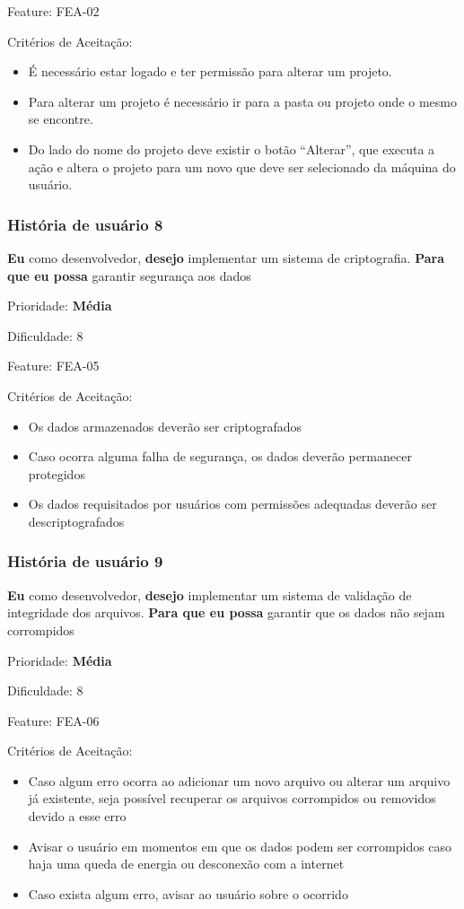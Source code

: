     Feature: FEA-02

    Critérios de Aceitação:
    \begin{itemize}
      \item É necessário estar logado e ter permissão para alterar um projeto. 
      \item Para alterar um projeto é necessário ir para a pasta ou projeto onde o mesmo se encontre.
      \item Do lado do nome do projeto deve existir o botão “Alterar”, que executa a ação e altera o projeto para um novo que deve ser selecionado da máquina do usuário.
    \end{itemize}

  \subsubsection{História de usuário 8}
    \textbf{Eu} como desenvolvedor, \textbf{desejo} implementar um sistema de criptografia. \textbf{Para que eu possa} garantir segurança aos dados

    Prioridade: \textbf{Média}

    Dificuldade: 8

    Feature: FEA-05

    Critérios de Aceitação:
    \begin{itemize}
      \item Os dados armazenados deverão ser criptografados
      \item Caso ocorra alguma falha de segurança, os dados deverão permanecer protegidos
      \item Os dados requisitados por usuários com permissões adequadas deverão ser descriptografados
    \end{itemize}

  \subsubsection{História de usuário 9}
    \textbf{Eu} como desenvolvedor, \textbf{desejo} implementar um sistema de validação de integridade dos arquivos. \textbf{Para que eu possa} garantir que os dados não sejam corrompidos

    Prioridade: \textbf{Média}

    Dificuldade: 8

    Feature: FEA-06

    Critérios de Aceitação:
    \begin{itemize}
      \item Caso algum erro ocorra ao adicionar um novo arquivo ou alterar um arquivo já existente, seja possível recuperar os arquivos corrompidos ou removidos devido a esse erro
      \item Avisar o usuário em momentos em que os dados podem ser corrompidos caso haja uma queda de energia ou desconexão com a internet
      \item Caso exista algum erro, avisar ao usuário sobre o ocorrido
    \end{itemize}

